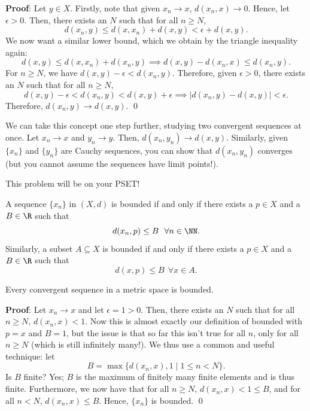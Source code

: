 \textbf{Proof}: Let $y\in X$. Firstly, note that given $x_n\to x$, $d(x_n,x) \to 0$. Hence, let $\epsilon>0$. Then, there exists an $N$ such that for all $n\geq N$,
\[
d(x_n,y) \leq d(x,x_n) + d(x,y)< \epsilon + d(x,y).
\]
We now want a similar lower bound, which we obtain by the triangle inequality again:
\[
d(x,y)\leq d(x,x_n) + d(x_n,y)\implies d(x,y) - d(x_n,x) \leq d(x_n,y).
\]
For $n\geq N$, we have $d(x,y) - \epsilon < d(x_n,y)$. Therefore, given $\epsilon>0$, there exists an $N$ such that for all $n\geq N$, 
\[
d(x,y) -\epsilon < d(x_n,y) < d(x,y) + \epsilon \implies |d(x_n,y)-d(x,y)| < \epsilon.
\]
Therefore, $d(x_n,y)\to d(x,y).$ \qed

\begin{proposition}
We can take this concept one step further, studying two convergent sequences at once. Let $x_n\to x$ and $y_n \to y$. Then, $d(x_n,y_n) \to d(x,y)$. Similarly, given $\{x_n\}$ and $\{y_n\}$ are Cauchy sequences, you can show that $d(x_n,y_n)$ converges (but you cannot assume the sequences have limit points!).
\end{proposition}
This problem will be on your PSET!

\begin{definition}[Bounded]
A sequence $\{x_n\}$ in $(X,d)$ is bounded if and only if there exists a $p\in X$ and a $B\in \R$ such that 
\[
d(x_n,p) \leq B ~~\forall n\in \NN.
\]
Similarly, a subset $A\subseteq X$ is bounded if and only if there exists a $p\in X$ and a $B\in \R$ such that 
\[
d(x,p) \leq B ~~\forall x\in A.
\]
\end{definition}

\begin{proposition}
Every convergent sequence in a metric space is bounded.
\end{proposition}
\textbf{Proof}: Let $x_n\to x$ and let $\epsilon = 1 >0$. Then, there exists an $N$ such that for all $n\geq N$, $d(x_n,x) < 1.$ Now this is almost exactly our definition of bounded with $p=x$ and $B=1$, but the issue is that so far this isn't true for all $n$, only for all $n\geq N$ (which is still infinitely many!). We thus use a common and useful technique: let 
\[
B = \max \{d(x_n, x), 1 \mid 1\leq n < N\}.
\]
Is $B$ finite? Yes; $B$ is the maximum of finitely many finite elements and is thus finite. Furthermore, we now have that for all $n\geq N$, $d(x_n,x) < 1 \leq B$, and for all $n<N$, $d(x_n,x) \leq B$. Hence, $\{x_n\}$ is bounded. \qed

